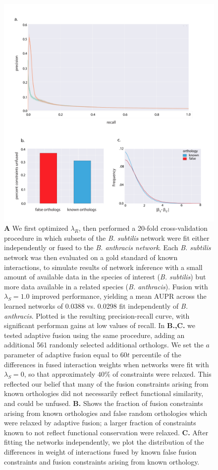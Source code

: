 \documentclass[11pt]{article}
\begin{document}
\pagebreak

\begin{figure}
\begin{center}
  \includegraphics[scale=0.30]{fig5_2.pdf}
  \caption{\label{xspecies-real} \textbf{A} We first optimized $\lambda_R$, then performed a 20-fold cross-validation procedure in which subsets of the \textit{B. subtilis} network were fit either independently or fused to the \textit{B. anthracis network}. Each \textit{B. subtilis} network was then evaluated on a gold standard of known interactions, to simulate results of network inference with a small amount of available data in the species of interest (\textit{B. subtilis}) but more data available in a related species (\textit{B. anthracis}). Fusion with $\lambda_S=1.0$ improved performance, yielding a mean AUPR across the learned networks of 0.0388 vs. 0.0298 fit independently of  \textit{B. anthracis}. Plotted is the resulting precision-recall curve, with significant performan gains at low values of recall. In \textbf{B.,C.} we tested adaptive fusion using the same procedure, adding an additional 561 randomly selected additional orthologs. We set the $a$ parameter of adaptive fusion equal to $60t$ percentile of the differences in fused interaction weights when networks were fit with $\lambda_S=0$, so that approximately $40\%$ of constraints were relaxed. This reflected our belief that many of the fusion constraints arising from known orthologies did not necessarily reflect functional similarity, and could be unfused. \textbf{B.} Shows the fraction of fusion constraints arising from known orthologies and false random orthologies which were relaxed by adaptive fusion; a larger fraction of constraints known to not reflect functional conservation were relaxed. \textbf{C.} After fitting the networks independently, we plot the distribution of the differences in weight of interactions fused by known false fusion constraints and fusion constraints arising from known orthology.}
\end{center}
\end{figure}
\end{document}
